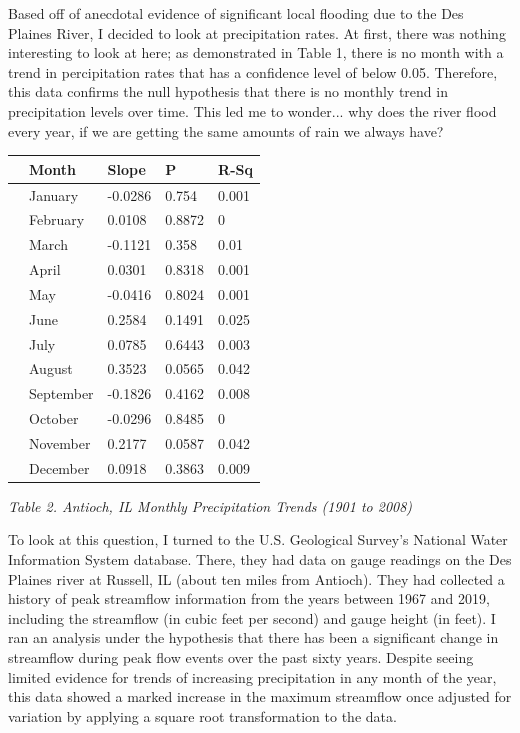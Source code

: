 \documentclass{article}\usepackage[]{graphicx}\usepackage[]{color}
\begin{document}
Based off of anecdotal evidence of significant local flooding due to the Des Plaines River, I decided to look at precipitation rates.  At first, there was nothing interesting to look at here; as demonstrated in Table 1, there is no month with a trend in percipitation rates that has a confidence level of below 0.05.  Therefore, this data confirms the null hypothesis that there is no monthly trend in precipitation levels over time.  This led me to wonder... why does the river flood every year, if we are getting the same amounts of rain we always have?
\newpage
\begin{table}[ht]
\centering
\begin{tabular}{rllll}
  \hline
 & Month & Slope & P & R-Sq \\ 
  \hline
  & January & -0.0286 & 0.754 & 0.001 \\ 
  & February & 0.0108 & 0.8872 & 0 \\ 
  & March & -0.1121 & 0.358 & 0.01 \\ 
  & April & 0.0301 & 0.8318 & 0.001 \\ 
  & May & -0.0416 & 0.8024 & 0.001 \\ 
  & June & 0.2584 & 0.1491 & 0.025 \\ 
  & July & 0.0785 & 0.6443 & 0.003 \\ 
  & August & 0.3523 & 0.0565 & 0.042 \\ 
  & September & -0.1826 & 0.4162 & 0.008 \\ 
  & October & -0.0296 & 0.8485 & 0 \\ 
  & November & 0.2177 & 0.0587 & 0.042 \\ 
  & December & 0.0918 & 0.3863 & 0.009 \\ 
   \hline
\end{tabular}
\end{table}

\emph{Table 2. Antioch, IL Monthly Precipitation Trends (1901 to 2008)}


To look at this question, I turned to the U.S. Geological Survey's National Water Information System database.  There, they had data on gauge readings on the Des Plaines river at Russell, IL (about ten miles from Antioch).  They had collected a history of peak streamflow information from the years between 1967 and 2019, including the streamflow (in cubic feet per second) and gauge height (in feet).  I ran an analysis under the hypothesis that there has been a significant change in streamflow during peak flow events over the past sixty years.  Despite seeing limited evidence for trends of increasing precipitation in any month of the year, this data showed a marked increase in the maximum streamflow once adjusted for variation by applying a square root transformation to the data.
\end{document}
